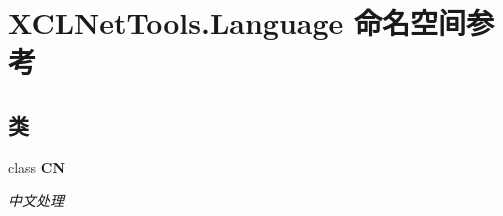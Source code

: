 \hypertarget{namespace_x_c_l_net_tools_1_1_language}{}\section{X\+C\+L\+Net\+Tools.\+Language 命名空间参考}
\label{namespace_x_c_l_net_tools_1_1_language}
\subsection*{类}
\begin{DoxyCompactItemize}
\item 
class {\bfseries CN}
\begin{DoxyCompactList}\small\item\em 中文处理 \end{DoxyCompactList}\end{DoxyCompactItemize}
